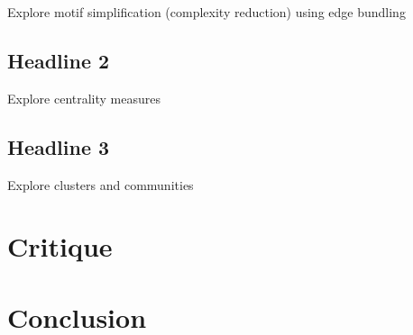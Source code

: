 \documentclass[11pt,letterpaper]{article}
\begin{document}
Explore motif simplification (complexity reduction) using edge bundling

\subsection*{Headline 2}

Explore centrality measures


\subsection*{Headline 3}

Explore clusters and communities

\section*{Critique}

\section*{Conclusion}



\end{document}
